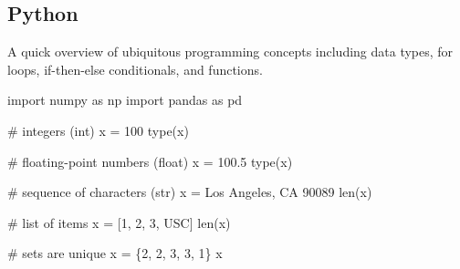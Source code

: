 \documentclass[
  letterpaper,
  DIV=11,
  numbers=noendperiod]{scrreprt}
\newenvironment{Shaded}{\begin{snugshade}}{\end{snugshade}}
\newcommand{\BuiltInTok}[1]{\textcolor[rgb]{0.00,0.23,0.31}{#1}}
\newcommand{\CommentTok}[1]{\textcolor[rgb]{0.37,0.37,0.37}{#1}}
\newcommand{\DecValTok}[1]{\textcolor[rgb]{0.68,0.00,0.00}{#1}}
\newcommand{\FloatTok}[1]{\textcolor[rgb]{0.68,0.00,0.00}{#1}}
\newcommand{\ImportTok}[1]{\textcolor[rgb]{0.00,0.46,0.62}{#1}}
\newcommand{\NormalTok}[1]{\textcolor[rgb]{0.00,0.23,0.31}{#1}}
\newcommand{\OperatorTok}[1]{\textcolor[rgb]{0.37,0.37,0.37}{#1}}
\newcommand{\StringTok}[1]{\textcolor[rgb]{0.13,0.47,0.30}{#1}}
\begin{document}
\subsection{Python}\label{python}

A quick overview of ubiquitous programming concepts including data
types, for loops, if-then-else conditionals, and functions.

\begin{Shaded}
\begin{Highlighting}[]
\ImportTok{import}\NormalTok{ numpy }\ImportTok{as}\NormalTok{ np}
\ImportTok{import}\NormalTok{ pandas }\ImportTok{as}\NormalTok{ pd}
\end{Highlighting}
\end{Shaded}

\begin{Shaded}
\begin{Highlighting}[]
\CommentTok{\# integers (int)}
\NormalTok{x }\OperatorTok{=} \DecValTok{100}
\BuiltInTok{type}\NormalTok{(x)}
\end{Highlighting}
\end{Shaded}

\begin{Shaded}
\begin{Highlighting}[]
\CommentTok{\# floating{-}point numbers (float)}
\NormalTok{x }\OperatorTok{=} \FloatTok{100.5}
\BuiltInTok{type}\NormalTok{(x)}
\end{Highlighting}
\end{Shaded}

\begin{Shaded}
\begin{Highlighting}[]
\CommentTok{\# sequence of characters (str)}
\NormalTok{x }\OperatorTok{=} \StringTok{\textquotesingle{}Los Angeles, CA 90089\textquotesingle{}}
\BuiltInTok{len}\NormalTok{(x)}
\end{Highlighting}
\end{Shaded}

\begin{Shaded}
\begin{Highlighting}[]
\CommentTok{\# list of items}
\NormalTok{x }\OperatorTok{=}\NormalTok{ [}\DecValTok{1}\NormalTok{, }\DecValTok{2}\NormalTok{, }\DecValTok{3}\NormalTok{, }\StringTok{\textquotesingle{}USC\textquotesingle{}}\NormalTok{]}
\BuiltInTok{len}\NormalTok{(x)}
\end{Highlighting}
\end{Shaded}

\begin{Shaded}
\begin{Highlighting}[]
\CommentTok{\# sets are unique}
\NormalTok{x }\OperatorTok{=}\NormalTok{ \{}\DecValTok{2}\NormalTok{, }\DecValTok{2}\NormalTok{, }\DecValTok{3}\NormalTok{, }\DecValTok{3}\NormalTok{, }\DecValTok{1}\NormalTok{\}}
\NormalTok{x}
\end{Highlighting}
\end{Shaded}
\end{document}
